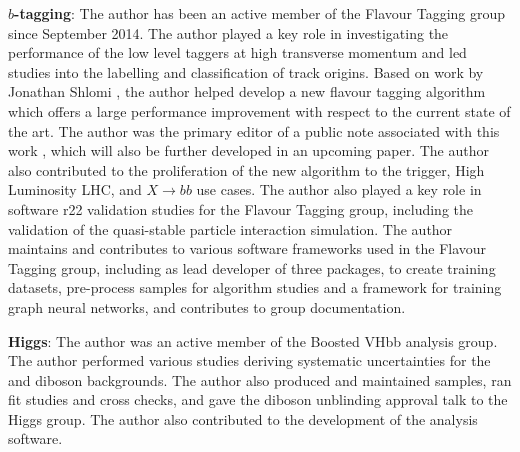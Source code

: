 \textbf{$b$-tagging}:
The author has been an active member of the Flavour Tagging group since September 2014. 
The author played a key role in investigating the performance of the low level taggers at high transverse momentum and led studies into the labelling and classification of track origins.
Based on work by Jonathan Shlomi \cite{2020-gnn-for-sv}, the author helped develop a new flavour tagging algorithm which offers a large performance improvement with respect to the current state of the art.
The author was the primary editor of a public note associated with this work \cite{ATL-PHYS-PUB-2022-027}, which will also be further developed in an upcoming paper.
The author also contributed to the proliferation of the new algorithm to the trigger, High Luminosity LHC, and $X \rightarrow bb$ use cases.
The author also played a key role in software r22 validation studies for the Flavour Tagging group, including the validation of the quasi-stable particle interaction simulation.
The author maintains and contributes to various software frameworks used in the Flavour Tagging group, including as lead developer of three packages, to create training datasets, pre-process samples for algorithm studies and a framework for training graph neural networks, and contributes to group documentation.

\textbf{Higgs}:
The author was an active member of the Boosted VHbb analysis group.
The author performed various studies deriving systematic uncertainties for the \Vjets and diboson backgrounds.
The author also produced and maintained samples, ran fit studies and cross checks, and gave the diboson unblinding approval talk to the Higgs group.
The author also contributed to the development of the analysis software.
